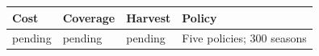 \begin{tabular}{llll}
Cost & Coverage & Harvest & Policy \\
\hline
pending & pending & pending & Five policies; 300 seasons \\
\end{tabular}
